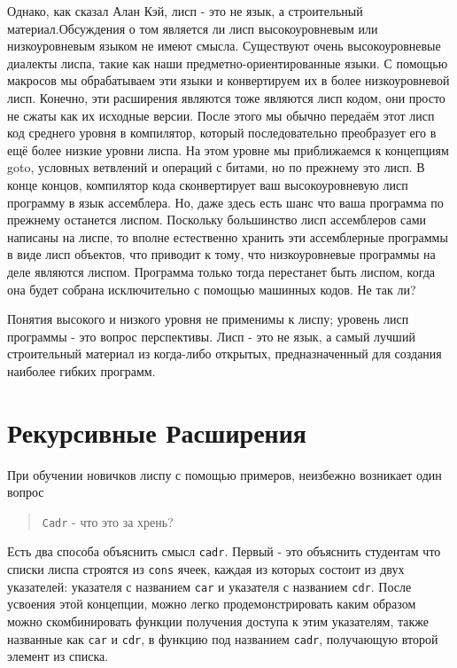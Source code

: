 Однако, как сказал Алан Кэй, лисп - это не язык, а строительный материал.Обсуждения о том является ли лисп высокоуровневым или низкоуровневым языком не имеют смысла. Существуют очень высокоуровневые диалекты лиспа, такие как наши предметно-ориентированные языки. С помощью макросов мы обрабатываем эти языки и конвертируем их в более низкоуровневой лисп. Конечно, эти расширения являются тоже являются лисп кодом, они просто не сжаты как их исходные версии. После этого мы обычно передаём этот лисп код среднего уровня в компилятор, который последовательно преобразует его в ещё более низкие уровни лиспа. На этом уровне мы приближаемся к концепциям goto, условных ветвлений и операций с битами, но по прежнему это лисп. В конце концов, компилятор кода сконвертирует ваш высокоуровневую лисп программу в язык ассемблера. Но, даже здесь есть шанс что ваша программа по прежнему останется лиспом. Поскольку большинство лисп ассемблеров сами написаны на лиспе, то вполне естественно хранить эти ассемблерные программы в виде лисп объектов, что приводит к тому, что низкоуровневые программы на деле являются лиспом. Программа только тогда перестанет быть лиспом, когда она будет собрана исключительно с помощью машинных кодов. Не так ли?

Понятия высокого и низкого уровня не применимы к лиспу; уровень лисп программы - это вопрос перспективы. Лисп - это не язык, а самый лучший строительный материал из когда-либо открытых, предназначенный для создания наиболее гибких программ.

\section{Рекурсивные Расширения}\label{section_recursive_expansions}

При обучении новичков лиспу с помощью примеров, неизбежно возникает один вопрос

\begin{quote}
\verb"Cadr" - что это за хрень?
\end{quote}

Есть два способа объяснить смысл \verb"cadr". Первый - это объяснить студентам что списки лиспа строятся из \verb"cons" ячеек, каждая из которых состоит из двух указателей: указателя с названием \verb"car" и указателя с названием \verb"cdr". После усвоения этой концепции, можно легко продемонстрировать каким образом можно скомбинировать функции получения доступа к этим указателям, также названные как \verb"car" и \verb"cdr", в функцию под названием \verb"cadr", получающую второй элемент из списка.

